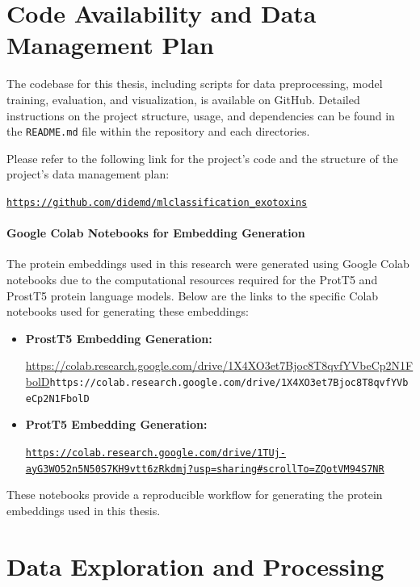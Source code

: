 


\section{Code Availability and Data Management Plan}

The codebase for this thesis, including scripts for data preprocessing, model training, evaluation, and visualization, is available on GitHub. 
Detailed instructions on the project structure, usage, and dependencies can be found in the \texttt{README.md} file within the repository and each directories.

Please refer to the following link for the project's code and the structure of the project's data management plan:

\href{https://github.com/didemd/mlclassification_exotoxins}{\texttt{https://github.com/didemd/mlclassification\_exotoxins}}

\paragraph{Google Colab Notebooks for Embedding Generation}

The protein embeddings used in this research were generated using Google Colab notebooks due to the computational resources required for the ProtT5 and ProstT5 protein language models. 
Below are the links to the specific Colab notebooks used for generating these embeddings:

\begin{itemize}
	\item \textbf{ProstT5 Embedding Generation:}
	
	 \url{https://colab.research.google.com/drive/1X4XO3et7Bjoc8T8qvfYVbeCp2N1FbolD}{\texttt{https://colab.research.google.com/drive/1X4XO3et7Bjoc8T8qvfYVbeCp2N1FbolD}}
	\item \textbf{ProtT5 Embedding Generation:}
	
	 \href{https://colab.research.google.com/drive/1TUj-ayG3WO52n5N50S7KH9vtt6zRkdmj?usp=sharing\#scrollTo=ZQotVM94S7NR}{\texttt{https://colab.research.google.com/drive/1TUj-ayG3WO52n5N50S7KH9vtt6zRkdmj?usp=sharing\#scrollTo=ZQotVM94S7NR}}
\end{itemize}

These notebooks provide a reproducible workflow for generating the protein embeddings used in this thesis.


\section{Data Exploration and Processing}


